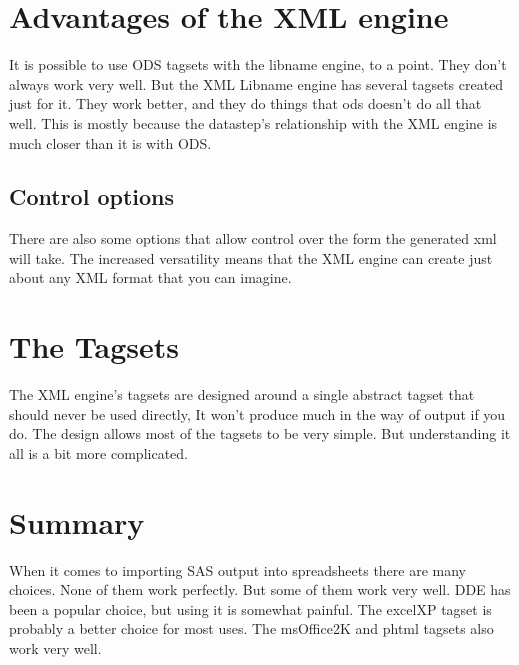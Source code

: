 
\section{Advantages of the XML engine}
It is possible to use ODS tagsets with the libname engine, to a point.  They
don't always work very well.  But the XML Libname engine has several tagsets 
created just for it.  They work better, and they do things that ods doesn't
do all that well.  This is mostly because the datastep's relationship with the
XML engine is much closer than it is with ODS.

\subsection{Control options}
There are also some options that allow control over the form the generated xml
will take.  The increased versatility means that the XML engine can create just
about any XML format that you can imagine.

\section{The Tagsets}
The XML engine's tagsets are designed around a single abstract tagset that should
never be used directly, It won't produce much in the way of output if you do.
The design allows most of the tagsets to be very simple.  But understanding it
all is a bit more complicated.

\section{Summary}
When it comes to importing SAS output into spreadsheets there are many choices.
None of them work perfectly.  But some of them work very well.  DDE has been a
popular choice, but using it is somewhat painful.  The excelXP tagset is probably
a better choice for most uses.  The msOffice2K and phtml tagsets also work very well.


